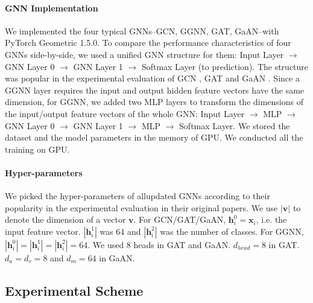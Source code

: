 \paragraph{GNN Implementation}
We implemented the four typical GNNs--GCN, GGNN, GAT, GaAN--with PyTorch Geometric 1.5.0.
To compare the performance characteristics of four GNNs side-by-side, we used a unified GNN structure for them: Input Layer $\rightarrow$ GNN Layer 0 $\rightarrow$ GNN Layer 1 $\rightarrow$ Softmax Layer (to prediction).
The structure was popular in the experimental evaluation of GCN \cite{kipf2017_gcn}, GAT \cite{huang2018_gat} and GaAN \cite{zhang2018_gaan}.
Since a GGNN layer requires the input and output hidden feature vectors have the same dimension, for GGNN, we added two MLP layers to transform the dimensions of the input/output feature vectors of the whole GNN: Input Layer $\rightarrow$ MLP $\rightarrow$ GNN Layer 0 $\rightarrow$ GNN Layer 1 $\rightarrow$ MLP $\rightarrow$ Softmax Layer.
We stored the dataset and the model parameters in the memory of GPU.
We conducted all the training on GPU.

\paragraph{Hyper-parameters}
We picked the hyper-parameters of allupdated GNNs according to their popularity in the experimental evaluation in their original papers.
We use $|\boldsymbol{v}|$ to denote the dimension of a vector $\boldsymbol{v}$.
For GCN/GAT/GaAN, $\boldsymbol{h}^0_i = \boldsymbol{x}_i$, i.e. the input feature vector.
$|\boldsymbol{h}^1_i|$ was 64 and $|\boldsymbol{h}^2_i|$ was the number of classes.
For GGNN, $|\boldsymbol{h}^0_i| = |\boldsymbol{h}^1_i| = |\boldsymbol{h}^2_i| = 64$.
We used 8 heads in GAT and GaAN.
$d_{head}=8$ in GAT.
$d_a=d_v=8$ and $d_m=64$ in GaAN.

\subsection{Experimental Scheme}
\label{sec:experimental_scheme}

